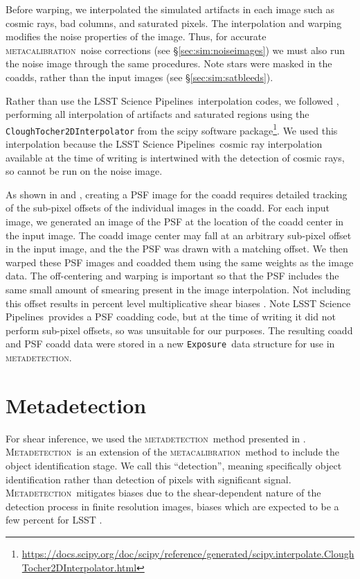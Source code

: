 \documentclass[twocolumn,twocolappendix,astrosym]{openjournal}
\newcommand{\calexp}{\texttt{Exposure}}
\newcommand{\dm}{LSST Science Pipelines}
\newcommand{\mcal}{\textsc{metacalibration}}
\newcommand{\mdet}{\textsc{metadetection}}
\newcommand{\Mdet}{\textsc{Metadetection}}
\begin{document}
Before warping, we interpolated the simulated artifacts in each image such as
cosmic rays, bad columns, and saturated pixels.  The interpolation and warping
modifies the noise properties of the image.  Thus, for accurate \mcal\ noise
corrections (see \S \ref{sec:sim:noiseimages}) we must also run the noise image
through the same procedures.  Note stars were masked in the coadds, rather than
the input images (see \S \ref{sec:sim:satbleeds}).

Rather than use the \dm\ interpolation codes, we followed \citet{BeckerMdetCoadd},
performing all interpolation of artifacts and saturated regions using the
\texttt{CloughTocher2DInterpolator} from the scipy software
package\footnote{\url{https://docs.scipy.org/doc/scipy/reference/generated/scipy.interpolate.CloughTocher2DInterpolator.html}}.
We used this interpolation because the \dm\ cosmic ray interpolation available
at the time of writing is intertwined with the detection of cosmic rays, so
cannot be run on the noise image.

As shown in \citet{ArmstrongCoadd} and \citet{BeckerMdetCoadd}, creating a PSF
image for the coadd requires detailed tracking of the sub-pixel offsets of the
individual images in the coadd. For each input image, we generated an image of
the PSF at the location of the coadd center in the input image. The coadd image
center may fall at an arbitrary sub-pixel offset in the input image, and the
the PSF was drawn with a matching offset.  We then warped these PSF images and
coadded them using the same weights as the image data. The off-centering and
warping is important so that the PSF includes the same small amount of smearing
present in the image interpolation. Not including this offset results in
percent level multiplicative shear biases \citep{ArmstrongCoadd}. Note \dm\
provides a PSF coadding code, but at the time of writing it did not perform
sub-pixel offsets, so was unsuitable for our purposes. The resulting coadd and
PSF coadd data were stored in a new \calexp\ data structure for use in \mdet.

\section{Metadetection} \label{sec:mdet}

For shear inference, we used the \mdet\ method presented in \cite{mdet20}.
\Mdet\ is an extension of the \mcal\ method
\citep{HuffMcal2017,SheldonMcal2017} to include the object identification
stage. We call this ``detection'', meaning specifically object identification
rather than detection of pixels with significant signal. \Mdet\ mitigates
biases due to the shear-dependent nature of the detection process in finite
resolution images, biases which are expected to be a few percent for LSST
\citep{mdet20}.
\end{document}
